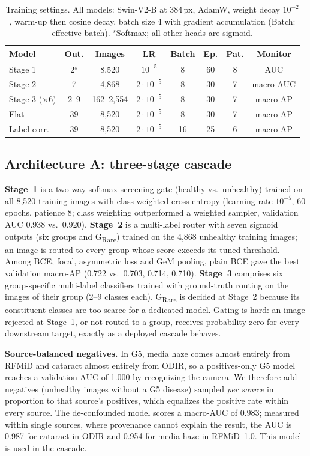 \documentclass[conference]{IEEEtran}
\newcommand{\grare}{G\textsubscript{Rare}}
\begin{document}
\begin{table}[t]
\centering
\caption{Training settings. All models: Swin-V2-B at 384\,px, AdamW, weight decay
$10^{-2}$, warm-up then cosine decay, batch size 4 with gradient accumulation
(Batch: effective batch). $^s$Softmax; all other heads are sigmoid.}
\label{tab:hparams}
\setlength{\tabcolsep}{2.4pt}
\footnotesize
\begin{tabular}{@{}lccccccc@{}}
\toprule
Model & Out. & Images & LR & Batch & Ep. & Pat. & Monitor\\
\midrule
Stage 1 & 2$^s$ & 8{,}520 & $10^{-5}$ & 8 & 60 & 8 & AUC\\
Stage 2 & 7 & 4{,}868 & $2{\cdot}10^{-5}$ & 8 & 30 & 7 & macro-AUC\\
Stage 3 ($\times$6) & 2--9 & 162--2{,}554 & $2{\cdot}10^{-5}$ & 8 & 30 & 7 & macro-AP\\
Flat & 39 & 8{,}520 & $2{\cdot}10^{-5}$ & 8 & 30 & 7 & macro-AP\\
Label-corr. & 39 & 8{,}520 & $2{\cdot}10^{-5}$ & 16 & 25 & 6 & macro-AP\\
\bottomrule
\end{tabular}
\end{table}

\subsection{Architecture A: three-stage cascade}
\textbf{Stage~1} is a two-way softmax screening gate (healthy vs.\ unhealthy)
trained on all 8{,}520 training images with class-weighted cross-entropy (learning
rate $10^{-5}$, 60 epochs, patience 8; class weighting outperformed a weighted
sampler, validation AUC 0.938 vs.\ 0.920). \textbf{Stage~2} is a multi-label router
with seven sigmoid outputs (six groups and \grare{}) trained on the 4{,}868 unhealthy
training images; an image is routed to every group whose score exceeds its tuned
threshold. Among BCE, focal, asymmetric loss and GeM pooling, plain BCE gave the best
validation macro-AP (0.722 vs.\ 0.703, 0.714, 0.710). \textbf{Stage~3} comprises six
group-specific multi-label classifiers trained with ground-truth routing on the
images of their group (2--9 classes each). \grare{} is decided at Stage~2 because
its constituent classes are too scarce for a dedicated model. Gating is hard: an
image rejected at Stage~1, or not routed to a group, receives probability zero for
every downstream target, exactly as a deployed cascade behaves.

\textbf{Source-balanced negatives.} In G5, media haze comes almost entirely from
RFMiD and cataract almost entirely from ODIR, so a positives-only G5 model reaches a
validation AUC of 1.000 by recognizing the camera. We therefore add negatives
(unhealthy images without a G5 disease) sampled \emph{per source} in proportion to
that source's positives, which equalizes the positive rate within every source. The
de-confounded model scores a macro-AUC of 0.983; measured within single sources,
where provenance cannot explain the result, the AUC is 0.987 for cataract in ODIR
and 0.954 for media haze in RFMiD~1.0. This model is used in the cascade.
\end{document}
